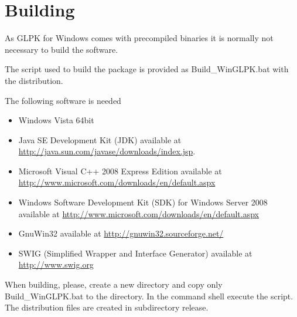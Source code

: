 \documentclass[a4paper,11pt]{report}
\begin{document}
\chapter{Building}
As GLPK for Windows comes with precompiled binaries it is normally not necessary to build the software.

The script used to build the package is provided as Build\_WinGLPK.bat with the distribution.

The following software is needed
\begin{itemize}
\item Windows Vista 64bit
\item Java SE Development Kit (JDK) available at \linebreak\href{http://java.sun.com/javase/downloads/index.jsp}{http://java.sun.com/javase/downloads/index.jsp}.
\item Microsoft Visual C++ 2008 Express Edition available at \linebreak\href{http://www.microsoft.com/downloads/en/default.aspx}{http://www.microsoft.com/downloads/en/default.aspx}
\item Windows Software Development Kit (SDK) for Windows Server 2008 available at \href{http://www.microsoft.com/downloads/en/default.aspx}{http://www.microsoft.com/downloads/en/default.aspx}
\item GnuWin32 available at \href{http://gnuwin32.sourceforge.net/}{http://gnuwin32.sourceforge.net/}
\item SWIG (Simplified Wrapper and Interface Generator) available at \linebreak\href{http://www.swig.org}{http://www.swig.org}
\end{itemize}
When building, please, create a new directory and copy only Build\_WinGLPK.bat to the directory. In the command shell execute the script. The distribution files are created in subdirectory release.
\end{document}
